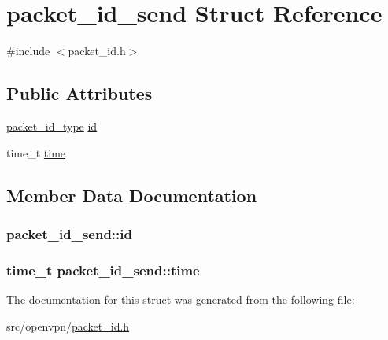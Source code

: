 \hypertarget{structpacket__id__send}{}\section{packet\+\_\+id\+\_\+send Struct Reference}
\label{structpacket__id__send}


{\ttfamily \#include $<$packet\+\_\+id.\+h$>$}

\subsection*{Public Attributes}
\begin{DoxyCompactItemize}
\item 
\hyperlink{packet__id_8h_a345f753b1c6ea20d24409e769aadb7e6}{packet\+\_\+id\+\_\+type} \hyperlink{structpacket__id__send_af7ca980ef194544404370ed5da4bd5b3}{id}
\item 
time\+\_\+t \hyperlink{structpacket__id__send_a4ada10c6f7e74b910c68589b5e8e5b16}{time}
\end{DoxyCompactItemize}


\subsection{Member Data Documentation}
\hypertarget{structpacket__id__send_af7ca980ef194544404370ed5da4bd5b3}{}
\subsubsection[{id}]{ packet\+\_\+id\+\_\+send\+::id}\label{structpacket__id__send_af7ca980ef194544404370ed5da4bd5b3}
\hypertarget{structpacket__id__send_a4ada10c6f7e74b910c68589b5e8e5b16}{}
\subsubsection[{time}]{\setlength{\rightskip}{0pt plus 5cm}time\+\_\+t packet\+\_\+id\+\_\+send\+::time}\label{structpacket__id__send_a4ada10c6f7e74b910c68589b5e8e5b16}


The documentation for this struct was generated from the following file\+:\begin{DoxyCompactItemize}
\item 
src/openvpn/\hyperlink{packet__id_8h}{packet\+\_\+id.\+h}\end{DoxyCompactItemize}
